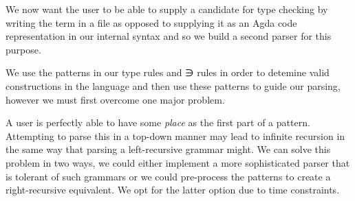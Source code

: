 {\begin{code}
\AgdaSymbol{)}\<%
\\
\>[0]\AgdaSpace{}%
\AgdaSpace{}%
\AgdaSpace{}%
\AgdaSpace{}%
\AgdaSymbol{(}\AgdaSymbol{;}\AgdaSpace{}%
\AgdaSymbol{;}\AgdaSpace{}%
\AgdaSymbol{)}\<%
\\
\>[0]\AgdaSpace{}%
\AgdaSpace{}%
\AgdaSpace{}%
\AgdaSymbol{(}\AgdaSpace{}%
\AgdaSpace{}%
\AgdaSymbol{)}\<%
\\
\>[0]\AgdaSpace{}%
\AgdaSpace{}%
\AgdaSpace{}%
\AgdaSymbol{(}\AgdaSpace{}%
\AgdaSpace{}%
\AgdaSymbol{)}\<%
\\
\>[0]\AgdaSpace{}%
\AgdaSpace{}%
\AgdaSpace{}%
\AgdaSymbol{(}\AgdaSymbol{)}\<%
\\
\>[0]\AgdaSpace{}%
\AgdaSpace{}%
\AgdaSpace{}%
\AgdaSpace{}%
\AgdaSymbol{(}\AgdaSymbol{;}\AgdaSpace{}%
\AgdaSymbol{)}\<%
\end{code}
}
We now want the user to be able to supply a candidate for type checking by
writing the term in a file as opposed to supplying it as an Agda code
representation in our internal syntax and so we build a second parser for this
purpose.

We use the patterns in our type rules and ∋ rules in order to detemine valid
constructions in the language and then use these patterns to guide our parsing,
however we must first overcome one major problem.

A user is perfectly able to have some \emph{place} as the first part of a pattern.
Attempting to parse this in a top-down manner may lead to infinite recursion in
the same way that parsing a left-recursive grammar might. We can solve this problem
in two ways, we could either implement a more sophisticated parser that is tolerant
of such grammars or we could pre-process the patterns to create a right-recursive
equivalent. We opt for the latter option due to time constraints.

